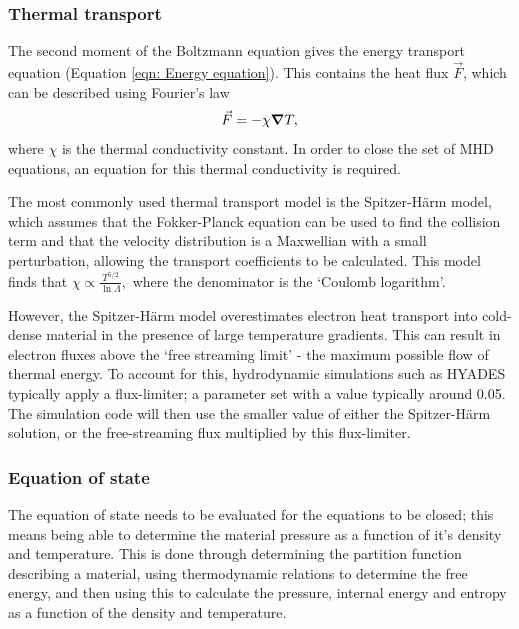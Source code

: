 \subsubsection{Thermal transport}

The second moment of the Boltzmann equation gives the energy transport equation (Equation \ref{eqn: Energy equation}). This contains the heat flux $\vec{F}$, which can be described using Fourier's law 
\begin{equation} \vec{F} = - \chi \grad T, \end{equation} where $\chi$ is the thermal conductivity constant. In order to close the set of MHD equations, an equation for this thermal conductivity is required.

The most commonly used thermal transport model is the Spitzer-H{\"a}rm model, which assumes that the Fokker-Planck equation can be used to find the collision term and that the velocity distribution is a Maxwellian with a small perturbation, allowing the transport coefficients to be calculated. This model finds that $\chi \propto \frac{T^{5/2}}{\ln{\Lambda}},$ where the denominator is the `Coulomb logarithm'.

However, the Spitzer-H{\"a}rm model overestimates electron heat transport into cold-dense material in the presence of large temperature gradients. This can result in electron fluxes above the `free streaming limit'  - the maximum possible flow of thermal energy. To account for this, hydrodynamic simulations such as HYADES typically apply a flux-limiter; a parameter set with a value typically around 0.05. The simulation code will then use the smaller value of either the Spitzer-H{\"a}rm solution, or the free-streaming flux multiplied by this flux-limiter. 

\subsubsection{Equation of state}
The equation of state needs to be evaluated for the equations to be closed; this means being able to determine the material pressure as a function of it's density and temperature. This is done through determining the partition function describing a material, using thermodynamic relations to determine the free energy, and then using this to calculate the pressure, internal energy and entropy as a function of the density and temperature.

